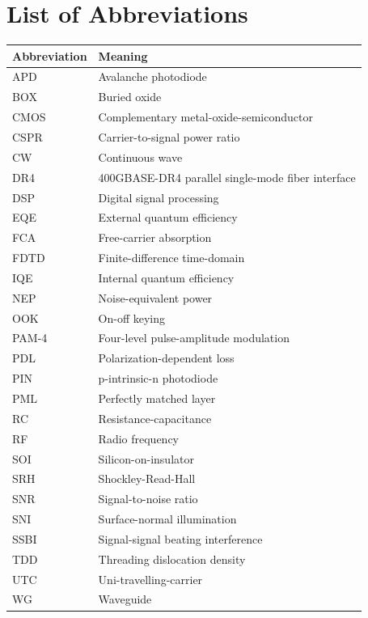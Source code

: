 ﻿\documentclass[12pt]{report}
\begin{document}
\chapter*{List of Abbreviations}
\begin{xltabular}{\textwidth}{L{0.18\textwidth} Y}
\toprule
Abbreviation & Meaning \\
\midrule
APD & Avalanche photodiode \\
BOX & Buried oxide \\
CMOS & Complementary metal-oxide-semiconductor \\
CSPR & Carrier-to-signal power ratio \\
CW & Continuous wave \\
DR4 & 400GBASE-DR4 parallel single-mode fiber interface \\
DSP & Digital signal processing \\
EQE & External quantum efficiency \\
FCA & Free-carrier absorption \\
FDTD & Finite-difference time-domain \\
IQE & Internal quantum efficiency \\
NEP & Noise-equivalent power \\
OOK & On-off keying \\
PAM-4 & Four-level pulse-amplitude modulation \\
PDL & Polarization-dependent loss \\
PIN & p-intrinsic-n photodiode \\
PML & Perfectly matched layer \\
RC & Resistance-capacitance \\
RF & Radio frequency \\
SOI & Silicon-on-insulator \\
SRH & Shockley-Read-Hall \\
SNR & Signal-to-noise ratio \\
SNI & Surface-normal illumination \\
SSBI & Signal-signal beating interference \\
TDD & Threading dislocation density \\
UTC & Uni-travelling-carrier \\
WG & Waveguide \\
\end{xltabular}
\cleardoublepage
\end{document}

